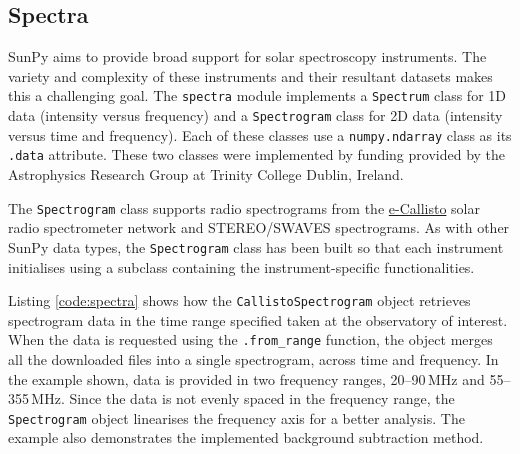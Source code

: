 \subsection{Spectra}\label{sec:spectra}

SunPy aims to provide broad support for solar spectroscopy
instruments.  The variety and complexity of these instruments and
their resultant datasets makes this a challenging goal.  The \texttt{spectra} module implements a
\texttt{Spectrum} class for 1D data (intensity versus frequency) and a
\texttt{Spectrogram} class for 2D data (intensity versus time and
frequency).  Each of these classes use a \texttt{numpy.ndarray} class
as its \texttt{.data} attribute.  These two classes were implemented
by funding provided by the Astrophysics Research Group at Trinity
College Dublin, Ireland.

The \texttt{Spectrogram} class supports radio spectrograms from the 
\href{http://www.e-callisto.org/}{e-Callisto}
solar radio spectrometer network and STEREO/SWAVES spectrograms.
As with other SunPy data types, the \texttt{Spectrogram} class has been
built so that each instrument initialises using a subclass containing the instrument-specific 
functionalities.

Listing \ref{code:spectra} shows how the \texttt{CallistoSpectrogram}
object retrieves spectrogram data in the time range specified taken at
the observatory of interest.  When the data is requested using the
\texttt{.from\_range} function, the object merges all the downloaded
files into a single spectrogram, across time and frequency.
In the example shown, data is provided in two frequency ranges, 
20--90\,MHz and 55--355\,MHz.  Since the data is not evenly spaced in
the frequency range, the \texttt{Spectrogram} object linearises the
frequency axis for a better analysis.  The example also demonstrates
the implemented background subtraction method.

